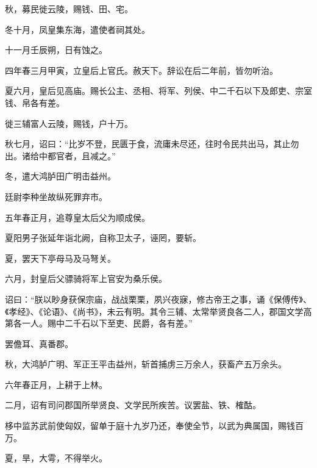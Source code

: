 \documentclass[12pt,UTF8]{ctexbook}
\begin{document}
秋，募民徙云陵，赐钱、田、宅。



冬十月，凤皇集东海，遣使者祠其处。



十一月壬辰朔，日有蚀之。



四年春三月甲寅，立皇后上官氏。赦天下。辞讼在后二年前，皆勿听治。



夏六月，皇后见高庙。赐长公主、丞相、将军、列侯、中二千石以下及郎吏、宗室钱、帛各有差。



徙三辅富人云陵，赐钱，户十万。



秋七月，诏曰：“比岁不登，民匮于食，流庸未尽还，往时令民共出马，其止勿出。诸给中都官者，且减之。”



冬，遣大鸿胪田广明击益州。



廷尉李种坐故纵死罪弃市。



五年春正月，追尊皇太后父为顺成侯。



夏阳男子张延年诣北阙，自称卫太子，诬罔，要斩。



夏，罢天下亭母马及马弩关。



六月，封皇后父骠骑将军上官安为桑乐侯。



诏曰：“朕以眇身获保宗庙，战战栗栗，夙兴夜寐，修古帝王之事，诵《保傅传》、《孝经》、《论语》、《尚书》，未云有明。其令三辅、太常举贤良各二人，郡国文学高第各一人。赐中二千石以下至吏、民爵，各有差。”



罢儋耳、真番郡。



秋，大鸿胪广明、军正王平击益州，斩首捕虏三万余人，获畜产五万余头。



六年春正月，上耕于上林。



二月，诏有司问郡国所举贤良、文学民所疾苦。议罢盐、铁、榷酤。



栘中监苏武前使匈奴，留单于庭十九岁乃还，奉使全节，以武为典属国，赐钱百万。



夏，旱，大雩，不得举火。
\end{document}
